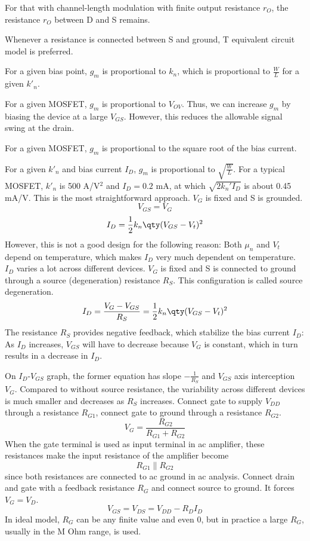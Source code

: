 \documentclass[a4paper,12pt]{report}
\begin{document}
For that with channel-length modulation with finite output resistance $r_O$, the resistance $r_O$ between D and S remains.

Whenever a resistance is connected between S and ground, T equivalent circuit model is preferred.
\bit
\item For a given bias point, $g_m$ is proportional to $k_n$, which is proportional to $\frac{W}{L}$ for a given $k'_n$.
\item For a given MOSFET, $g_m$ is proportional to $V_{OV}$. Thus, we can increase $g_m$ by biasing the device at a large $V_{GS}$. However, this reduces the allowable signal swing at the drain.
\item For a given MOSFET, $g_m$ is proportional to the square root of the bias current.
\item For a given $k'_n$ and bias current $I_D$, $g_m$ is proportional to $\sqrt{\frac{W}{L}}$. For a typical MOSFET, $k'_n$ is 500 \textmu{}A/V$^2$ and $I_D=0.2$ mA, at which $\sqrt{2k_n'I_D}$ is about 0.45 mA/V.
\eit
{}
This is the most straightforward approach. $V_G$ is fixed and S is grounded.
\[V_{GS}=V_G\]
\[I_D=\frac{1}{2}k_n\qty(V_{GS}-V_t)^2\]
However, this is not a good design for the following reason:
\bit
\itm Both $\mu_n$ and $V_t$ depend on temperature, which makes $I_D$ very much dependent on temperature.
\itm $I_D$ varies a lot across different devices.
\eit
{}
$V_G$ is fixed and S is connected to ground through a source (degeneration) resistance $R_S$. This configuration is called source degeneration.
\[I_D=\frac{V_G-V_{GS}}{R_S}=\frac{1}{2}k_n\qty(V_{GS}-V_t)^2\]
The resistance $R_S$ provides negative feedback, which stabilize the bias current $I_D$: As $I_D$ increases, $V_{GS}$ will have to decrease because $V_G$ is constant, which in turn results in a decrease in $I_D$.

On $I_D$-$V_{GS}$ graph, the former equation has slope $-\frac{1}{R_S}$ and $V_{GS}$ axis interception $V_G$. Compared to without source resistance, the variability across different devices is much smaller and decreases as $R_S$ increases.
Connect gate to supply $V_{DD}$ through a resistance $R_{G1}$, connect gate to ground through a resistance $R_{G2}$.
\[V_G=\frac{R_{G2}}{R_{G1}+R_{G2}}\]
When the gate terminal is used as input terminal in ac amplifier, these resistances make the input resistance of the amplifier become
\[R_{G1}\parallel R_{G2}\]
since both resistances are connected to ac ground in ac analysis.
Connect drain and gate with a feedback resistance $R_G$ and connect source to ground. It forces $V_G=V_D$.
\[V_{GS}=V_{DS}=V_{DD}-R_DI_D\]
In ideal model, $R_G$ can be any finite value and even 0, but in practice a large $R_G$, usually in the M Ohm range, is used.
\end{document}
